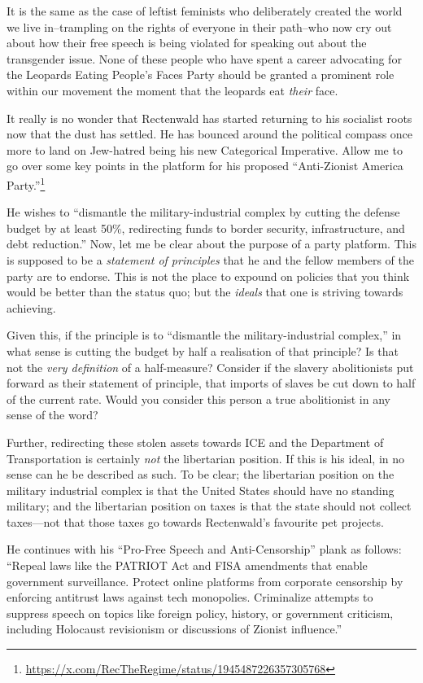 \documentclass[11pt]{article}
\begin{document}
It is the same as the case of leftist feminists who deliberately created the world we live in--trampling on the rights of everyone in their path--who now cry out about how their free speech is being violated for speaking out about the transgender issue. None of these people who have spent a career advocating for the Leopards Eating People's Faces Party should be granted a prominent role within our movement the moment that the leopards eat \emph{their} face.

It really is no wonder that Rectenwald has started returning to his socialist roots now that the dust has settled. He has bounced around the political compass once more to land on Jew-hatred being his new Categorical Imperative. Allow me to go over some key points in the platform for his proposed ``Anti-Zionist America Party.''\footnote{\url{https://x.com/RecTheRegime/status/1945487226357305768}}

He wishes to ``dismantle the military-industrial complex by cutting the defense budget by at least 50\%, redirecting funds to border security, infrastructure, and debt reduction.'' Now, let me be clear about the purpose of a party platform. This is supposed to be a \emph{statement of principles} that he and the fellow members of the party are to endorse. This is not the place to expound on policies that you think would be better than the status quo; but the \emph{ideals} that one is striving towards achieving.

Given this, if the principle is to ``dismantle the military-industrial complex,'' in what sense is cutting the budget by half a realisation of that principle? Is that not the \emph{very definition} of a half-measure? Consider if the slavery abolitionists put forward as their statement of principle, that imports of slaves be cut down to half of the current rate. Would you consider this person a true abolitionist in any sense of the word?

Further, redirecting these stolen assets towards ICE and the Department of Transportation is certainly \emph{not} the libertarian position. If this is his ideal, in no sense can he be described as such. To be clear; the libertarian position on the military industrial complex is that the United States should have no standing military; and the libertarian position on taxes is that the state should not collect taxes---not that those taxes go towards Rectenwald's favourite pet projects.

He continues with his ``Pro-Free Speech and Anti-Censorship'' plank as follows: ``Repeal laws like the PATRIOT Act and FISA amendments that enable government surveillance. Protect online platforms from corporate censorship by enforcing antitrust laws against tech monopolies. Criminalize attempts to suppress speech on topics like foreign policy, history, or government criticism, including Holocaust revisionism or discussions of Zionist influence.''
\end{document}
